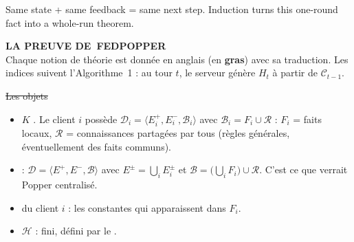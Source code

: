 \documentclass[10pt]{article}
\begin{document}
\vspace{5pt}

\begin{tcolorbox}[colback=marine, colframe=marine, arc=0pt, boxrule=0pt,
  halign=center, top=3pt, bottom=3pt]
\color{white}\small Same state + same feedback = same next step. Induction turns this one-round fact into a whole-run theorem.
\end{tcolorbox}

\detailpages

{\fontsize{24}{26}\selectfont\bfseries\textcolor{marine}{LA PREUVE DE}~FEDPOPPER}\\[2pt]
{\normalsize Chaque notion de théorie est donnée en anglais (en \textbf{gras}) avec sa traduction.
Les indices suivent l'Algorithme~1 : au tour $t$, le serveur génère $H_t$ à partir de $\mathcal{C}_{t-1}$.}


\st{Les objets}
\begin{itemize}
  \item $K$ . Le client $i$ possède $\mathcal{D}_i=\langle E_i^+,E_i^-,\mathcal{B}_i\rangle$ avec $\mathcal{B}_i=F_i\cup\mathcal{R}$ :
        $F_i$ = faits locaux, $\mathcal{R}$ = connaissances partagées par tous (règles générales, éventuellement des faits communs).
  \item {} : $\mathcal{D}=\langle E^+,E^-,\mathcal{B}\rangle$ avec $E^\pm=\bigcup_iE_i^\pm$ et
        $\mathcal{B}=\bigl(\bigcup_iF_i\bigr)\cup\mathcal{R}$. C'est ce que verrait Popper centralisé.
  \item {} du client $i$ : les constantes qui apparaissent dans $F_i$.
  \item {} $\mathcal{H}$ : fini, défini par le .
\end{itemize}
\end{document}
